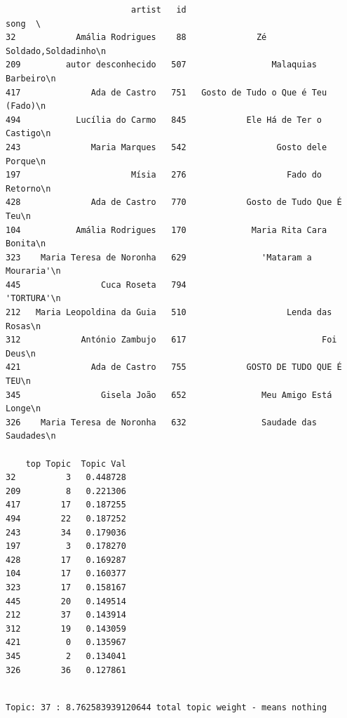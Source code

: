 \documentclass[11pt]{article}
\begin{document}
    
    \begin{verbatim}
                         artist   id                                 song  \
32            Amália Rodrigues    88              Zé Soldado,Soldadinho\n   
209         autor desconhecido   507                 Malaquias Barbeiro\n   
417              Ada de Castro   751   Gosto de Tudo o Que é Teu (Fado)\n   
494           Lucília do Carmo   845            Ele Há de Ter o Castigo\n   
243              Maria Marques   542                  Gosto dele Porque\n   
197                      Mísia   276                    Fado do Retorno\n   
428              Ada de Castro   770            Gosto de Tudo Que É Teu\n   
104           Amália Rodrigues   170             Maria Rita Cara Bonita\n   
323    Maria Teresa de Noronha   629               'Mataram a Mouraria'\n   
445                Cuca Roseta   794                          'TORTURA'\n   
212   Maria Leopoldina da Guia   510                    Lenda das Rosas\n   
312            António Zambujo   617                           Foi Deus\n   
421              Ada de Castro   755            GOSTO DE TUDO QUE É TEU\n   
345                Gisela João   652               Meu Amigo Está Longe\n   
326    Maria Teresa de Noronha   632               Saudade das Saudades\n   

    top Topic  Topic Val  
32          3   0.448728  
209         8   0.221306  
417        17   0.187255  
494        22   0.187252  
243        34   0.179036  
197         3   0.178270  
428        17   0.169287  
104        17   0.160377  
323        17   0.158167  
445        20   0.149514  
212        37   0.143914  
312        19   0.143059  
421         0   0.135967  
345         2   0.134041  
326        36   0.127861  
    \end{verbatim}

    
    \begin{Verbatim}[commandchars=\\\{\}]

Topic: 37 : 8.762583939120644 total topic weight - means nothing

    \end{Verbatim}
\end{document}
